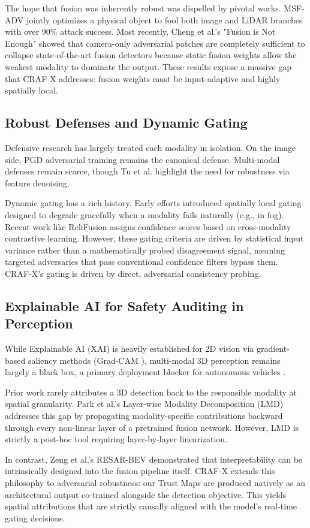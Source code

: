 The hope that fusion was inherently robust was dispelled by pivotal works. MSF-ADV \cite{CaoMSFADV2021} jointly optimizes a physical object to fool both image and LiDAR branches with over 90\% attack success. Most recently, Cheng et al.'s "Fusion is Not Enough" \cite{ChengFusion2024} showed that camera-only adversarial patches are completely sufficient to collapse state-of-the-art fusion detectors because static fusion weights allow the weakest modality to dominate the output. These results expose a massive gap that CRAF-X addresses: fusion weights must be input-adaptive and highly spatially local.

\subsection{Robust Defenses and Dynamic Gating}
Defensive research has largely treated each modality in isolation. On the image side, PGD adversarial training \cite{MadryPGD2018} remains the canonical defense. Multi-modal defenses remain scarce, though Tu et al. \cite{TuMultiSensor2021} highlight the need for robustness via feature denoising. 

Dynamic gating has a rich history. Early efforts \cite{ArevaloGMU2017,ValadaSSMA2020} introduced spatially local gating designed to degrade gracefully when a modality fails naturally (e.g., in fog). Recent work like ReliFusion \cite{SadeghianReliFusion2025} assigns confidence scores based on cross-modality contrastive learning. However, these gating criteria are driven by statistical input variance rather than a mathematically probed disagreement signal, meaning targeted adversaries that pass conventional confidence filters bypass them. CRAF-X's gating is driven by direct, adversarial consistency probing.

\subsection{Explainable AI for Safety Auditing in Perception}
While Explainable AI (XAI) is heavily established for 2D vision via gradient-based saliency methods (Grad-CAM \cite{SelvarajuGradCAM2017}), multi-modal 3D perception remains largely a black box, a primary deployment blocker for autonomous vehicles \cite{YeongXAIAV2025}.

Prior work rarely attributes a 3D detection back to the responsible modality at spatial granularity. Park et al.'s Layer-wise Modality Decomposition (LMD) \cite{ParkLMD2025} addresses this gap by propagating modality-specific contributions backward through every non-linear layer of a pretrained fusion network. However, LMD is strictly a post-hoc tool requiring layer-by-layer linearization. 

In contrast, Zeng et al.'s RESAR-BEV \cite{ZengRESARBEV2025} demonstrated that interpretability can be intrinsically designed into the fusion pipeline itself. CRAF-X extends this philosophy to adversarial robustness: our Trust Maps are produced natively as an architectural output co-trained alongside the detection objective. This yields spatial attributions that are strictly causally aligned with the model's real-time gating decisions.